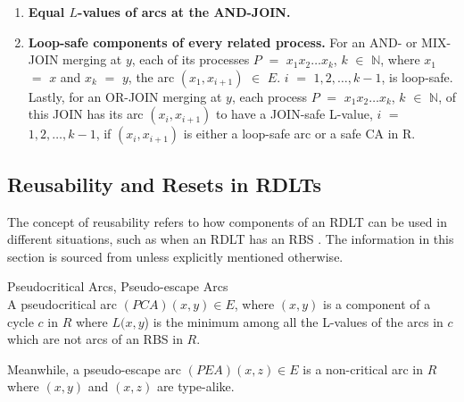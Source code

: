 \begin{defn}
\begin{enumerate}
\begin{itemize}
        \end{itemize}
        \item \textbf{Equal $ L $-values of arcs at the AND-JOIN.}
        \item \textbf{Loop-safe components of every related process.} For an AND- or MIX-JOIN merging at $y$, each of its processes $ P $ $ = $ $ x_1 x_2 \ldots x_k $, $ k $ $ \in $ $ \mathbb{N} $, where $ x_1 $ $ = $ $ x $ and $ x_k $ $ = $ $ y $, the arc $ (x_1, x_{i+1}) $ $ \in $ $ E $. $ i $ $ = $ $ 1, 2, \ldots, k - 1 $, is loop-safe. Lastly, for an OR-JOIN merging at $ y $, each process $ P $ $ = $ $ x_1 x_2 \ldots x_k $, $ k $ $ \in $ $ \mathbb{N} $, of this JOIN has its arc $ (x_i,x_{i+1}) $ to have a JOIN-safe L-value, $ i $ $ = $ $ 1, 2, \ldots, k - 1 $, if $ (x_i, x_{i+1}) $ is either a loop-safe arc or a safe CA in R.
    \end{enumerate}
    
\end{defn}
\subsection*{Reusability and Resets in RDLTs}
The concept of reusability refers to how components of an RDLT can be used in different situations, such as when an RDLT has an RBS \cite{MalinaoWCTP2023}. The information in this section is sourced from \cite{MalinaoWCTP2023} unless explicitly mentioned otherwise.

\begin{defn} Pseudocritical Arcs, Pseudo-escape Arcs \\
A pseudocritical arc $(PCA) (x,y) \in E$, where $(x,y)$ is a component of a cycle $c$ in $R$ where $L(x,y$) is the minimum among all the L-values of the arcs in $c$ which are not arcs of an RBS in $R$.

Meanwhile, a pseudo-escape arc $(PEA) (x,z) \in E$ is a non-critical arc in $R$ where $(x,y)$ and $(x,z)$ are type-alike.    
\end{defn}

